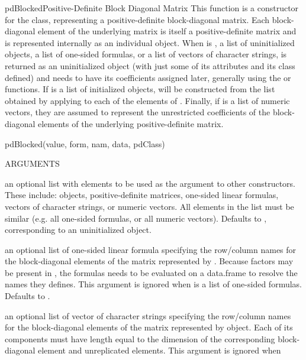 \documentclass[pdftex]{article} \usepackage{url,graphicx}
\begin{document}
\begin{Helpfile}{pdBlocked}{Positive-Definite Block Diagonal Matrix}
This function is a constructor for the  class,
representing a positive-definite block-diagonal matrix. Each
block-diagonal element of the underlying  matrix is itself a
positive-definite matrix and is represented internally as an
individual  object. When  is
, a list of uninitialized  objects, a
list of one-sided formulas, or a list of vectors 
of character strings,   is returned
as an uninitialized  object (with just some of its
attributes and its class defined) and needs to have its coefficients
assigned later, generally using the  or 
functions. If  is a list of  initialized 
objects,  will be constructed from the list obtained by
applying  to each of the  elements of
. Finally, if  is a list of numeric vectors,
they are assumed to represent the unrestricted coefficients
of the block-diagonal elements of the  underlying positive-definite
matrix.
\begin{Example}
pdBlocked(value, form, nam, data, pdClass)
\end{Example}
\begin{Argument}{ARGUMENTS}
\item[\Co{value:}]
an optional list with elements to be used as the
 argument to other  constructors. These
include:  objects, positive-definite
matrices, one-sided linear formulas, vectors of character strings, or
numeric vectors. All elements in the list must be similar (e.g. all
one-sided formulas, or all numeric vectors). Defaults to
, corresponding to an uninitialized object.
\item[\Co{form:}]
an optional list of one-sided linear formula specifying the
row/column names for the block-diagonal elements of the matrix
represented by . Because factors may be present in
, the formulas needs to be evaluated on a data.frame to
resolve the names they defines. This argument is ignored when
 is a list of one-sided formulas. Defaults to .
\item[\Co{nam:}]
an optional list of vector of character strings specifying the
row/column names for the block-diagonal elements of the matrix
represented by object. Each of its components must have  
length equal to the dimension of the corresponding block-diagonal
element and unreplicated elements. This argument is ignored when 

\end{Argument}
\end{Helpfile}
\end{document}
